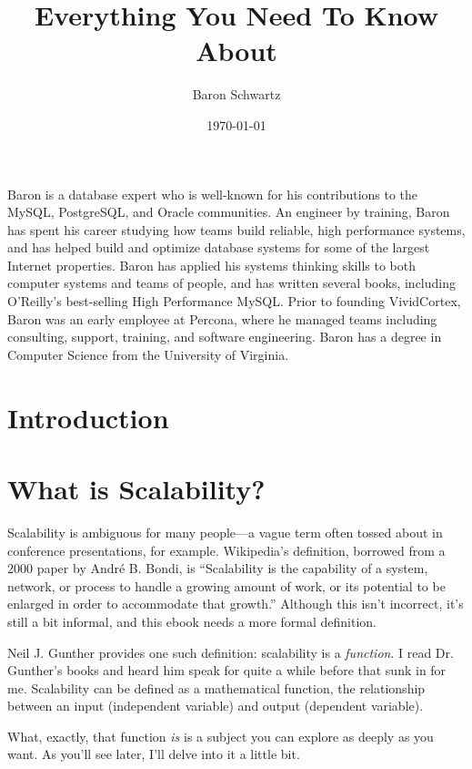 \documentclass{vivid_layout_pdf}
\title{Everything You Need To Know About}{Scalability}
\date{\today}
\author{Baron Schwartz}{img/baron}
\begin{document}
\maketitle		%
\begin{bio}		%
Baron is a database expert who is well-known for his contributions to the MySQL, PostgreSQL, and Oracle communities. An engineer by training, Baron has spent his career studying how teams build reliable, high performance systems, and has helped build and optimize database systems for some of the largest Internet properties. Baron has applied his systems thinking skills to both computer systems and teams of people, and has written several books, including O'Reilly's best-selling High Performance MySQL. Prior to founding VividCortex, Baron was an early employee at Percona, where he managed teams including consulting, support, training, and software engineering. Baron has a degree in Computer Science from the University of Virginia.
\end{bio}
\tableofcontents	%

\section{Introduction}

\section{What is Scalability?}

Scalability is ambiguous for many people---a vague term often tossed about in
conference presentations, for example. Wikipedia's definition, borrowed from
a 2000 paper by Andr\'e B. Bondi,
is ``Scalability is the capability of a system, network, or process to handle a
growing amount of work, or its potential to be enlarged in order to accommodate
that growth.'' Although this isn't incorrect, it's still a bit informal, and
this ebook needs a more formal definition.

Neil J. Gunther provides one such definition: scalability is a {\itshape
function}. I read Dr. Gunther's books and heard him speak for quite a while
before that sunk in for me. Scalability can be defined as a mathematical
function, the relationship between an input (independent variable) and output
(dependent variable).

What, exactly, that function {\itshape is} is a subject you can explore as
deeply as you want. As you'll see later, I'll delve into it a little bit.
\end{document}
